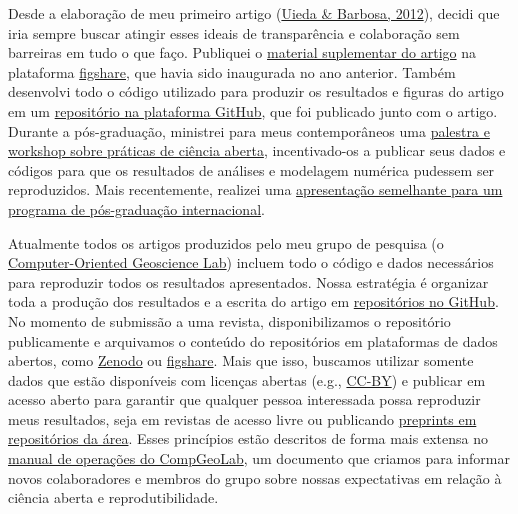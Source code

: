 \documentclass[a4paper,onecolumn,10pt]{article}
\begin{document}
Desde a elaboração de meu primeiro artigo
(\href{https://github.com/pinga-lab/paper-planting-densities}{Uieda \& Barbosa,
2012}), decidi que iria sempre buscar atingir esses ideais de transparência e
colaboração sem barreiras em tudo o que faço.
Publiquei o
\href{https://doi.org/10.6084/m9.figshare.91574}{material suplementar do
artigo} na plataforma
\href{https://figshare.com/authors/Leonardo_Uieda/97471}{figshare},
que havia sido inaugurada no ano anterior.
Também desenvolvi todo o código utilizado para produzir os resultados e figuras
do artigo em um \href{https://github.com/pinga-lab/paper-planting-densities}{repositório na plataforma GitHub}, que foi publicado junto com o
artigo.
Durante a pós-graduação, ministrei para meus contemporâneos uma
\href{https://doi.org/10.6084/m9.figshare.774537.v3}{palestra e
workshop sobre práticas de ciência aberta},
incentivado-os a publicar seus dados e códigos para que os resultados de
análises e modelagem numérica pudessem ser reproduzidos.
Mais recentemente, realizei uma
\href{https://www.leouieda.com/2022-05-06-spin-open-science/}{apresentação
semelhante para um programa de pós-graduação internacional}.

Atualmente todos os artigos produzidos pelo meu grupo de pesquisa
(o \href{https://www.compgeolab.org/}{Computer-Oriented Geoscience Lab})
incluem todo o código e dados necessários para reproduzir todos os resultados
apresentados.
Nossa estratégia é organizar toda a produção dos resultados e a escrita do
artigo em \href{https://github.com/compgeolab/micromag-euler-dipole}{repositórios no GitHub}.
No momento de submissão a uma revista, disponibilizamos o repositório
publicamente e arquivamos o conteúdo do repositórios em plataformas de dados
abertos,
como \href{https://doi.org/10.5281/zenodo.16191}{Zenodo} ou
\href{https://doi.org/10.6084/m9.figshare.22672978.v3}{figshare}.
Mais que isso, buscamos utilizar somente dados que estão disponíveis com
licenças abertas (e.g.,
\href{https://creativecommons.org/licenses/by/4.0/}{CC-BY})
e publicar em acesso aberto para garantir que qualquer pessoa interessada
possa reproduzir meus resultados, seja em revistas de acesso livre ou
publicando \href{https://doi.org/10.31223/X58G7C}{preprints em repositórios da área}.
Esses princípios estão descritos de forma mais extensa no
\href{https://www.compgeolab.org/manual/}{manual de operações do CompGeoLab},
um documento que criamos para informar novos colaboradores e membros
do grupo sobre nossas expectativas em relação à ciência aberta e
reprodutibilidade.
\end{document}

